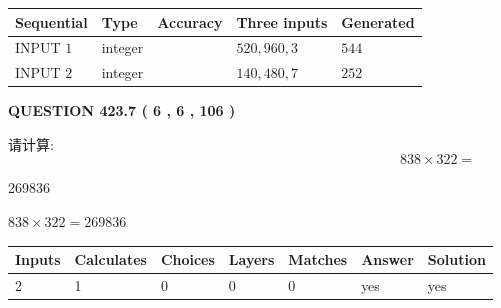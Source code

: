 \documentclass{ctexart}
\begin{document}
   
  
  
\noindent\begin{tabular}{|l|l|l|l|l|}
\hline
 Sequential & Type & Accuracy & Three inputs & Generated \\ 
\hline
 
 
  INPUT $  1 $ & integer &  & $
 520
 , 
 960
 , 
 3
 $ & $ 544 $ 
 \\  \hline  
 
 
  INPUT $  2 $ & integer &  & $
 140
 , 
 480
 , 
 7
 $ & $ 252 $ 
 \\  \hline  
 \end{tabular}
   
   
  
\vspace{0.2in}
  
{\textbf{\Large{QUESTION
423.7 
 ( 6 , 6 , 106 )
}}}
  
  
 
请计算:
\begin{equation}
838  \times    %
322 = \nonumber
\end{equation}
 
 
 
\noindent{}
 
 

269836
 
 
\noindent{}
 
 

 
 
 
\noindent{}
 
 

$ %
838 \times  %
322=   %
269836$
 
 
\noindent{}
 
 

 
   
   
   
   
\noindent\begin{tabular}{|l|l|l|l|l|l|l|}
 \hline
Inputs & Calculates & Choices & Layers & Matches & Answer & Solution \\ \hline
 2  & 
 1  & 
 0
  & 
 0  & 
 0  & 
  yes & 
  yes 
  \\ \hline
 \end{tabular}
   
\end{document}
